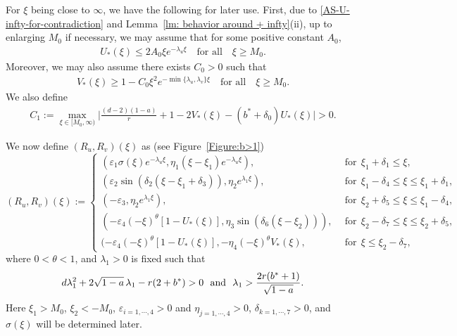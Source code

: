 \documentclass[11pt,a4paper]{article}
\numberwithin{equation}{section}
\numberwithin{figure}{section}
\newcommand{\red}[1]{{\color{red}#1}}
\newcommand\bea{\begin{eqnarray}}
\newcommand\eea{\end{eqnarray}}
\begin{document}
For $\xi$ being close to $\infty$, we have the following for later use. First,
due to \eqref{AS-U-infty-for-contradiction} and Lemma~\ref{lm: behavior around + infty}(ii), up to enlarging $M_0$ if necessary, we may assume that for some positive constant $A_0$,
\bea\label{U-M}
U_*(\xi) \leq 2A_0\xi e^{-\lambda_u\xi}\quad\mbox{for all}\quad\xi\geq M_0.
\eea
Moreover, we may also assume there exists $C_0>0$ such that
\bea\label{V-lower-bound-infty}
V_*(\xi) \geq 1-C_0\xi^2 e^{-\min\{\lambda_u,\lambda_v\}\xi}\quad
\mbox{for all}\quad\xi\geq M_0.
\eea
We also define
\bea\label{C1}
C_1:=\max_{\xi\in[M_0,\infty)}\Big|\frac{(d-2)(1-a)}{r}+1-2V_*(\xi)-(b^*+\delta_0)U_*(\xi)\Big|>0.
\eea


We now define $(R_u,R_v)(\xi)$ as (see Figure~\ref{Figure:b>1})
\begin{equation*}
(R_u,R_v)(\xi):=\begin{cases}
(\varepsilon_1\sigma(\xi) e^{-\lambda_u\xi},\eta_1 (\xi-\xi_1)e^{-\lambda_u\xi}),&\ \ \mbox{for}\ \ \xi_1+\delta_1\le\xi,\\
(\varepsilon_2\sin(\delta_2(\xi-\xi_1+\delta_3)),\eta_2e^{\lambda_{1}\xi}),&\ \ \mbox{for}\ \ \xi_1-\delta_4\le\xi\le\xi_{1}+\delta_1,\\
(-\varepsilon_3,\eta_2e^{\lambda_{1}\xi}),&\ \ \mbox{for}\ \ \xi_2+\delta_5\le\xi\le\xi_1-\delta_4,\\
(-\varepsilon_4(-\xi)^{\theta}[1-U_*(\xi)],\eta_3\sin(\delta_6(\xi-\xi_2))),&\ \ \mbox{for}\ \ \xi_2-\delta_7\le\xi\le\xi_2+\delta_5,\\
(-\varepsilon_4(-\xi)^{\theta}[1-U_*(\xi)],-\eta_4(-\xi)^{\theta}V_*(\xi),&\ \ \mbox{for}\ \ \xi\le\xi_2-\delta_7,
\end{cases}
\end{equation*}
where
$0<\theta<1$, and $\lambda_{1}>0$ is fixed such that
\begin{equation}\label{condition on lambda 1 system}
d\lambda_1^2+2\sqrt{1-a}\,\lambda_1-r(2+b^*)>0\ \ {\rm and}\ \ \lambda_1>\frac{2r(b^*+1)}{\sqrt{1-a}}.
\end{equation}
Here $\xi_1>M_0$, $\xi_2<-M_0$, $\varepsilon_{i=1,\cdots,4}>0$ and $\eta_{j=1,\cdots,4}>0$, $\delta_{k=1,\cdots,7}>0$,
and $\sigma(\xi)$ will be determined later.

\end{document}
